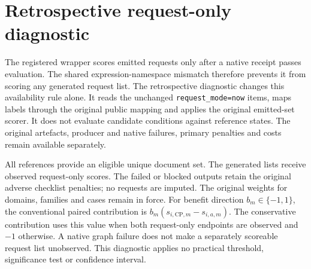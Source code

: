 \section{Retrospective request-only diagnostic}
\label{app:request-diagnostic}

The registered wrapper scores emitted requests only after a native receipt
passes evaluation. The shared expression-namespace mismatch therefore
prevents it from scoring any generated request list. The retrospective
diagnostic changes this availability rule alone. It reads the unchanged
\texttt{request\_mode=now} items, maps labels through the original public
mapping and applies the original emitted-set scorer. It does not evaluate
candidate conditions against reference states. The original artefacts,
producer and native failures, primary penalties and costs remain available
separately.

All \nbClaims{} references provide an eligible unique document set.
The \nrRequestObserved{} generated lists receive observed request-only
scores. The \nrRequestPenalties{} failed or blocked outputs retain the
original adverse checklist penalties; no requests are imputed. The original
weights for domains, families and cases remain in force. For benefit
direction $b_m\in\{-1,1\}$, the conventional paired contribution is
$b_m(s_{i,\mathrm{CP},m}-s_{i,a,m})$. The conservative contribution uses
this value when both request-only endpoints are observed and $-1$ otherwise.
A native graph failure does not make a separately scoreable request list
unobserved. This diagnostic applies no practical threshold, significance
test or confidence interval.

\begin{table}[htb]
\centering\small
\setlength{\tabcolsep}{4pt}

\caption{Request counts and output coverage. Lists counts artefacts that
supply raw counts. Correct/req., Missed and Cond. sum over those artefacts
only; Cond. counts conditionally deferred documents. Precision and recall
use the full population with failure penalties and the specified weights,
so they differ from ratios of the raw counts. Dependent controls reuse the
same assessments.}
\label{tab:native-counts}
\end{table}

\begin{table}[htb]
\centering\small

\caption{Paired request-only contrasts on protected families. Positive values
favour \casepath. The unnecessary-fraction contrast reverses sign so that a
reduction in burden is positive. The conservative contrast assigns $-1$
when either endpoint is unobserved. The machine-readable report includes
every endpoint, family and family-deletion result.}
\label{tab:native-contrasts}
\end{table}

